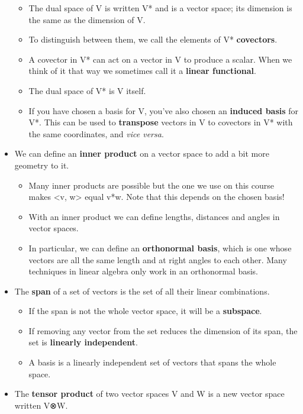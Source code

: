 \documentclass[oneside,english]{amsbook}
\numberwithin{section}{chapter}
\theoremstyle{plain}
\theoremstyle{definition}
\begin{document}
\begin{itemize}
	\begin{itemize}
		\item
		The dual space of V is written V* and is a vector space; its
		dimension is the same as the dimension of V.
		\item
		To distinguish between them, we call the elements of V*
		\textbf{covectors}.
		\item
		A covector in V* can act on a vector in V to produce a scalar. When
		we think of it that way we sometimes call it a \textbf{linear
			functional}.
		\item
		The dual space of V* is V itself.
		\item
		If you have chosen a basis for V, you've also chosen an
		\textbf{induced basis} for V*. This can be used to
		\textbf{transpose} vectors in V to covectors in V* with the same
		coordinates, and \emph{vice versa}.
	\end{itemize}
	\item
	We can define an \textbf{inner product} on a vector space to add a bit
	more geometry to it.
	
	\begin{itemize}
		\item
		Many inner products are possible but the one we use on this course
		makes \textless v, w\textgreater{} equal v*w. Note that this depends
		on the chosen basis!
		\item
		With an inner product we can define lengths, distances and angles in
		vector spaces.
		\item
		In particular, we can define an \textbf{orthonormal basis}, which is
		one whose vectors are all the same length and at right angles to
		each other. Many techniques in linear algebra only work in an
		orthonormal basis.
	\end{itemize}
	\item
	The \textbf{span} of a set of vectors is the set of all their linear
	combinations.
	
	\begin{itemize}
		\item
		If the span is not the whole vector space, it will be a
		\textbf{subspace}.
		\item
		If removing any vector from the set reduces the dimension of its
		span, the set is \textbf{linearly independent}.
		\item
		A basis is a linearly independent set of vectors that spans the
		whole space.
	\end{itemize}
	\item
	The \textbf{tensor product} of two vector spaces V and W is a new
	vector space written V⊗W.
	

\end{itemize}
\end{document}
